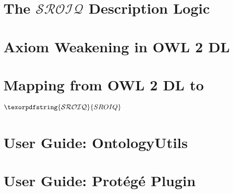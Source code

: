 \documentclass[10pt,a4paper]{report}
\theoremstyle{plain}
\theoremstyle{definition}
\theoremstyle{remark}
\newcommand{\SROIQ}{\ensuremath{\texorpdfstring{\mathcal{SROIQ}}{SROIQ}}\xspace}
\begin{document}



\printbibliography

\appendix

\chapter{The \texorpdfstring{$\mathcal{SROIQ}$}{SROIQ} Description Logic} \label{sroiq-appendix}



\chapter{Axiom Weakening in OWL 2 DL} \label{weakening-owl-2-dl}



\chapter{Mapping from OWL 2 DL to \SROIQ} \label{owl-to-sroiq}



\chapter{User Guide: OntologyUtils} \label{guide-prototype}



\chapter{User Guide: Protégé Plugin} \label{guide-plugin}


\end{document}
